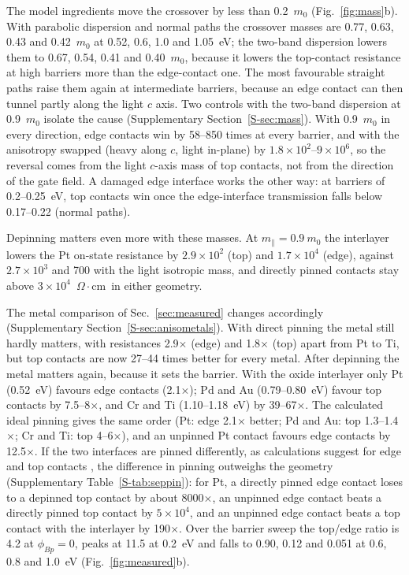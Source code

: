 \documentclass[11pt]{article}
\providecommand{\ohmcm}{\ensuremath{\Omega\cdot\mathrm{cm}}}
\providecommand{\ohmcm}{\ensuremath{\Omega\cdot\mathrm{cm}}}
\begin{document}
The model ingredients move the crossover by less than 0.2~$m_0$ (Fig.~\ref{fig:mass}b). With parabolic dispersion and normal paths the crossover masses are 0.77, 0.63, 0.43 and 0.42~$m_0$ at 0.52, 0.6, 1.0 and 1.05~eV; the two-band dispersion lowers them to 0.67, 0.54, 0.41 and 0.40~$m_0$, because it lowers the top-contact resistance at high barriers more than the edge-contact one. The most favourable straight paths raise them again at intermediate barriers, because an edge contact can then tunnel partly along the light $c$ axis. Two controls with the two-band dispersion at 0.9~$m_0$ isolate the cause (Supplementary Section~\ref{S-sec:mass}). With 0.9~$m_0$ in every direction, edge contacts win by 58--850 times at every barrier, and with the anisotropy swapped (heavy along $c$, light in-plane) by $1.8\times10^2$--$9\times10^6$, so the reversal comes from the light $c$-axis mass of top contacts, not from the direction of the gate field. A damaged edge interface works the other way: at barriers of 0.2--0.25~eV, top contacts win once the edge-interface transmission falls below 0.17--0.22 (normal paths).

Depinning matters even more with these masses. At $m_\parallel=0.9~m_0$ the interlayer lowers the Pt on-state resistance by $2.9\times10^2$ (top) and $1.7\times10^4$ (edge), against $2.7\times10^3$ and 700 with the light isotropic mass, and directly pinned contacts stay above $3\times10^4$~\ohmcm\ in either geometry.

The metal comparison of Sec.~\ref{sec:measured} changes accordingly (Supplementary Section~\ref{S-sec:anisometals}). With direct pinning the metal still hardly matters, with resistances 2.9$\times$ (edge) and 1.8$\times$ (top) apart from Pt to Ti, but top contacts are now 27--44 times better for every metal. After depinning the metal matters again, because it sets the barrier. With the oxide interlayer only Pt (0.52~eV) favours edge contacts (2.1$\times$); Pd and Au (0.79--0.80~eV) favour top contacts by 7.5--8$\times$, and Cr and Ti (1.10--1.18~eV) by 39--67$\times$. The calculated ideal pinning gives the same order (Pt: edge 2.1$\times$ better; Pd and Au: top 1.3--1.4$\times$; Cr and Ti: top 4--6$\times$), and an unpinned Pt contact favours edge contacts by 12.5$\times$. If the two interfaces are pinned differently, as calculations suggest for edge and top contacts \cite{refparto}, the difference in pinning outweighs the geometry (Supplementary Table~\ref{S-tab:seppin}): for Pt, a directly pinned edge contact loses to a depinned top contact by about 8000$\times$, an unpinned edge contact beats a directly pinned top contact by $5\times10^4$, and an unpinned edge contact beats a top contact with the interlayer by 190$\times$. Over the barrier sweep the top/edge ratio is 4.2 at $\phi_{Bp}=0$, peaks at 11.5 at 0.2~eV and falls to 0.90, 0.12 and 0.051 at 0.6, 0.8 and 1.0~eV (Fig.~\ref{fig:measured}b).
\end{document}
